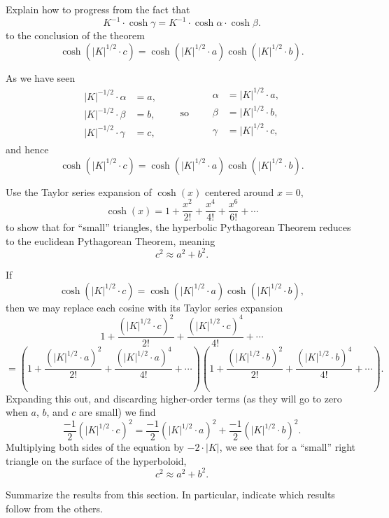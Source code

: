 \documentclass[newpage,hints,handout]{ximera}
\begin{document}
\begin{problem}
  Explain how to progress from the fact that
  \[
  K^{-1}\cdot \cosh \gamma = K^{-1} \cdot \cosh\alpha \cdot \cosh\beta.
  \]
  to the conclusion of the theorem
  \[
  \cosh(|K|^{1/2}\cdot c)=\cosh(|K|^{1/2} \cdot a)\cosh(|K|^{1/2}\cdot b).
  \]
  \begin{freeResponse}
    As we have seen
    \[
    \begin{split}
      |K|^{-1/2}\cdot \alpha &= a,\\
      |K|^{-1/2}\cdot \beta  &= b,\\
      |K|^{-1/2}\cdot \gamma &= c,
    \end{split}
    \qquad\text{so}\qquad
    \begin{split}
      \alpha &= |K|^{1/2} \cdot a,\\
      \beta  &= |K|^{1/2} \cdot b,\\
      \gamma &= |K|^{1/2} \cdot c,\\
    \end{split}
    \]
    and hence
    \[
      \cosh\left(|K|^{1/2}\cdot c\right)=\cosh\left(|K|^{1/2} \cdot a\right)\cosh\left(|K|^{1/2}\cdot b\right).
    \]
  \end{freeResponse}
\end{problem}


\begin{problem}
  Use the Taylor series expansion of $\cosh(x)$ centered around $x=0$,
  \[
  \cosh(x) = 1 + \frac{x^2}{2!} + \frac{x^4}{4!} + \frac{x^6}{6!} + \cdots
  \]
to show that for ``small'' triangles, the hyperbolic Pythagorean
Theorem reduces to the euclidean Pythagorean Theorem, meaning
\[
c^2 \approx a^2+b^2.
\]
\begin{freeResponse}
  If
  \[
  \cosh\left(|K|^{1/2}\cdot c\right)=\cosh\left(|K|^{1/2}\cdot a\right)\cosh\left(|K|^{1/2}\cdot b\right),
  \]
  then we may replace each cosine with its Taylor series expansion
  \[
  1 + \frac{\left(|K|^{1/2}\cdot c\right)^2}{2!} + \frac{\left(|K|^{1/2}\cdot c\right)^4}{4!} +  \cdots
  \]
  \[
  =\left(
  1 + \frac{\left(|K|^{1/2}\cdot a\right)^2}{2!} + \frac{\left(|K|^{1/2}\cdot a\right)^4}{4!} +  \cdots
  \right)
  \left(
  1 + \frac{\left(|K|^{1/2}\cdot b\right)^2}{2!} + \frac{\left(|K|^{1/2}\cdot b\right)^4}{4!} + \cdots
  \right).
  \]
  Expanding this out, and discarding higher-order terms (as they will
  go to zero when $a$, $b$, and $c$ are small) we find
  \[
  \frac{-1}{2}\left(|K|^{1/2}\cdot c\right)^2 = \frac{-1}{2}\left(|K|^{1/2}\cdot a\right)^2+\frac{-1}{2}\left(|K|^{1/2}\cdot b\right)^2.
  \]
  Multiplying both sides of the equation by $-2\cdot |K|$, we see that for a
  ``small'' right triangle on the surface of the hyperboloid,
  \[
  c^2 \approx a^2 +b^2.
  \]
\end{freeResponse}
\end{problem}


\begin{problem}
Summarize the results from this section. In particular, indicate which
results follow from the others.
\begin{freeResponse}
\end{freeResponse}
\end{problem}
\end{document}
